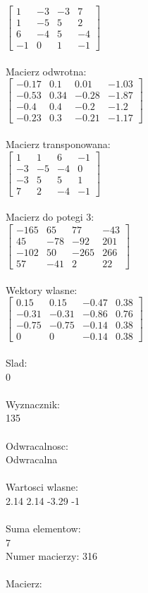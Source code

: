 \documentclass[a4paper,12pt]{article}
\begin{document}
$\begin{bmatrix} 1&-3&-3&7\\1&-5&5&2\\6&-4&5&-4\\-1&0&1&-1 \end{bmatrix}$
\\
\\
Macierz odwrotna:\\

$\begin{bmatrix} -0.17&0.1&0.01&-1.03\\-0.53&0.34&-0.28&-1.87\\-0.4&0.4&-0.2&-1.2\\-0.23&0.3&-0.21&-1.17 \end{bmatrix}$
\\
\\
Macierz transponowana:\\

$\begin{bmatrix} 1&1&6&-1\\-3&-5&-4&0\\-3&5&5&1\\7&2&-4&-1 \end{bmatrix}$
\\
\\
Macierz do potegi 3:\\

$\begin{bmatrix} -165&65&77&-43\\45&-78&-92&201\\-102&50&-265&266\\57&-41&2&22 \end{bmatrix}$
\\
\\
Wektory wlasne:\\

$\begin{bmatrix} 0.15&0.15&-0.47&0.38\\-0.31&-0.31&-0.86&0.76\\-0.75&-0.75&-0.14&0.38\\0&0&-0.14&0.38 \end{bmatrix}$
\\
\\
Slad:\\
0
\\
\\
Wyznacznik:\\
135
\\
\\
Odwracalnosc:\\
Odwracalna
\\
\\
Wartosci wlasne:\\
2.14 2.14 -3.29 -1
\\
\\
Suma elementow:\\
7
\\
\newpage
Numer macierzy:
316
\\
\\
Macierz:\\
\end{document}
